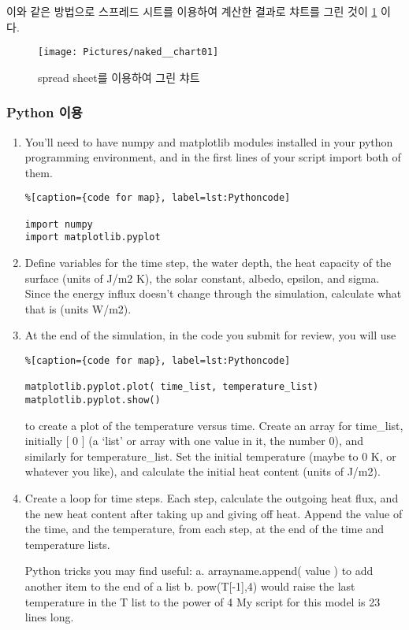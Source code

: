 이와 같은 방법으로 스프레드 시트를 이용하여 계산한 결과로 챠트를 그린 것이 \ref{fig:nakedchart01} 이다. 
\begin{figure}[b!]
	\centering
	\texttt{[image: Pictures/naked\_\_chart01]}
	\caption{spread sheet를 이용하여 그린 챠트}
	\label{fig:nakedchart01}
\end{figure}

\newpage

\subsubsection{Python 이용}\index{}
\begin{enumerate}
	\item You’ll need to have numpy and matplotlib modules installed in your python programming environment, and in the first lines of your script import both of them.


\begin{lstlisting}%[caption={code for map}, label=lst:Pythoncode]

import numpy
import matplotlib.pyplot
\end{lstlisting}

	\item Define variables for the time step, the water depth, the heat capacity of the surface (units of J/m2 K), the solar constant, albedo, epsilon, and sigma. Since the energy influx doesn’t change through the simulation, calculate what that is (units W/m2).
	\item At the end of the simulation, in the code you submit for review, you will use

\begin{lstlisting}%[caption={code for map}, label=lst:Pythoncode]

matplotlib.pyplot.plot( time_list, temperature_list)
matplotlib.pyplot.show()
\end{lstlisting}

to create a plot of the temperature versus time. Create an array for time_list, initially [ 0 ] (a ‘list’ or array with one value in it, the number 0), and similarly for temperature_list. Set the initial temperature (maybe to 0 K, or whatever you like), and calculate the initial heat content (units of J/m2).

	\item Create a loop for time steps. Each step, calculate the outgoing heat flux, and the new heat content after taking up and giving off heat. Append the value of the time, and the temperature, from each step, at the end of the time and temperature lists.
	
Python tricks you may find useful:
a. arrayname.append( value ) to add another item to the end of a list
b. pow(T[-1],4) would raise the last temperature in the T list to the power of 4
My script for this model is 23 lines long.


\end{enumerate}



